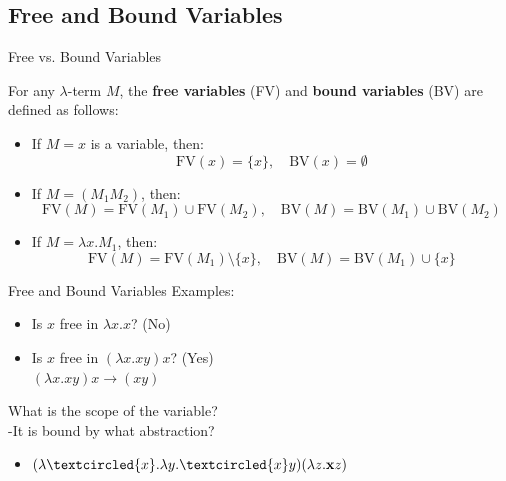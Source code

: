 \documentclass{beamer}
\begin{document}
\subsection{Free and Bound Variables}
\begin{frame}{Free vs. Bound Variables}

  \begin{definition}
    For any $\lambda$-term \(M\), the \textbf{free variables} (FV) and \textbf{bound variables} (BV) are defined as follows:
    \begin{itemize}
      \item If \(M = x\) is a variable, then:
        \[
        \text{FV}(x) = \{x\}, \quad \text{BV}(x) = \emptyset
        \]
      \item If \(M = (M_1 M_2)\), then:
        \[
        \text{FV}(M) = \text{FV}(M_1) \cup \text{FV}(M_2), \quad \text{BV}(M) = \text{BV}(M_1) \cup \text{BV}(M_2)
        \]
      \item If \(M = \lambda x.M_1\), then:
        \[
        \text{FV}(M) = \text{FV}(M_1) \setminus \{x\}, \quad \text{BV}(M) = \text{BV}(M_1) \cup \{x\}
        \]
    \end{itemize}
  \end{definition}

\end{frame}
\begin{frame}{Free and Bound Variables}
  Examples:
  \begin{itemize}
    \item Is $x$ free in $\lambda x.x$? (No)
    \item Is $x$ free in $(\lambda x.xy)x$? (Yes)\\
    $(\lambda x.xy)x \to (xy)$
  \end{itemize}
  \vspace{1em}
  What is the scope of the variable?\\
  -It is bound by what abstraction?\\
  \begin{itemize}
    \item $(\lambda \textcircled{x}.\lambda y.\textcircled{x}y) (\lambda z.\mathbf{x}z)$
  \end{itemize}
\end{frame}
\end{document}

